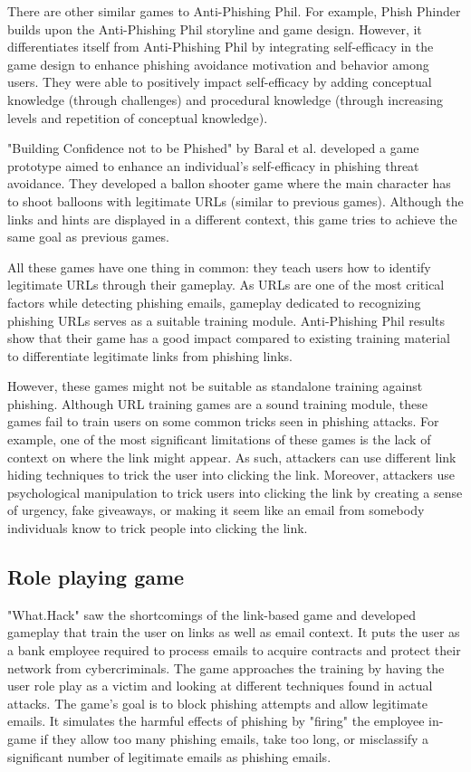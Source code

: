 There are other similar games to Anti-Phishing Phil. For example, Phish Phinder \cite{phish_phinder} builds upon the Anti-Phishing Phil storyline and game design. However, it differentiates itself from Anti-Phishing Phil by integrating self-efficacy in the game design to enhance phishing avoidance motivation and behavior among users. They were able to positively impact self-efficacy by adding conceptual knowledge (through challenges) and procedural knowledge (through increasing levels and repetition of conceptual knowledge).

"Building Confidence not to be Phished"\cite{gamified_approach} by Baral et al. developed a game prototype aimed to enhance an individual's self-efficacy in phishing threat avoidance. They developed a ballon shooter game where the main character has to shoot balloons with legitimate URLs (similar to previous games). Although the links and hints are displayed in a different context, this game tries to achieve the same goal as previous games.

All these games have one thing in common: they teach users how to identify legitimate URLs through their gameplay. As URLs are one of the most critical factors while detecting phishing emails, gameplay dedicated to recognizing phishing URLs serves as a suitable training module. Anti-Phishing Phil results show that their game has a good impact compared to existing training material to differentiate legitimate links from phishing links.

However, these games might not be suitable as standalone training against phishing. Although URL training games are a sound training module, these games fail to train users on some common tricks seen in phishing attacks. For example, one of the most significant limitations of these games is the lack of context on where the link might appear. As such, attackers can use different link hiding techniques to trick the user into clicking the link. Moreover, attackers use psychological manipulation to trick users into clicking the link by creating a sense of urgency, fake giveaways, or making it seem like an email from somebody individuals know to trick people into clicking the link.

\subsection{Role playing game}
"What.Hack" \cite{what_hack} saw the shortcomings of the link-based game and developed gameplay that train the user on links as well as email context. It puts the user as a bank employee required to process emails to acquire contracts and protect their network from cybercriminals. The game approaches the training by having the user role play as a victim and looking at different techniques found in actual attacks. The game's goal is to block phishing attempts and allow legitimate emails. It simulates the harmful effects of phishing by "firing" the employee in-game if they allow too many phishing emails, take too long, or misclassify a significant number of legitimate emails as phishing emails.

